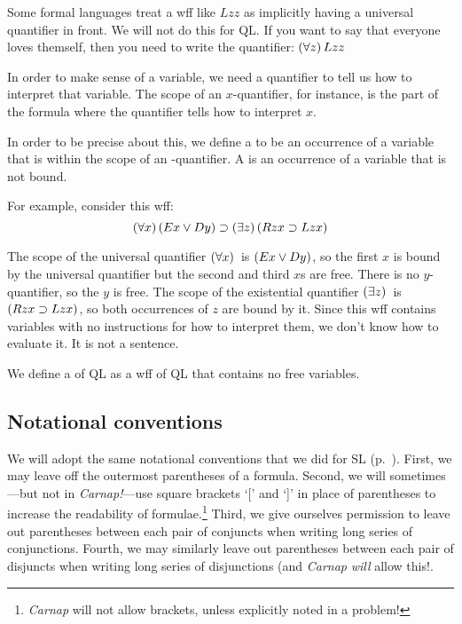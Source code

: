 Some formal languages treat a wff like $Lzz$ as implicitly having a universal quantifier in front. We will not do this for QL. If you want to say that everyone loves themself, then you need to write the quantifier: $(\forall z) \,Lzz$

In order to make sense of a variable, we need a quantifier to tell us how to interpret that variable. The scope of an $x$-quantifier, for instance, is the part of the formula where the quantifier tells how to interpret $x$.

In order to be precise about this, we define a  to be an occurrence of a variable  that is within the scope of an -quantifier. A  is an occurrence of a variable that is not bound.

For example, consider this wff: $$(\forall x) \,(Ex \vee Dy) \supset (\exists z) \,(Rzx \supset Lzx)$$ 

The scope of the universal quantifier $(\forall x) \,$ is $(Ex \vee Dy)$, so the first $x$ is bound by the universal quantifier but the second and third $x$s are free. There is no $y$-quantifier, so the $y$ is free. The scope of the existential quantifier $(\exists z) \,$ is $(Rzx \supset Lzx)$, so both occurrences of $z$ are bound by it. Since this wff contains variables with no instructions for how to interpret them, we don't know how to evaluate it. It is not a sentence.

We define a  of QL as a wff of QL that contains no free variables.

\subsection{Notational conventions}

We will adopt the same notational conventions that we did for SL (p.~\pageref{SLconventions}). First, we may leave off the outermost parentheses of a formula. Second, we will sometimes---but not in \textit{Carnap!}---use square brackets `[' and `]' in place of parentheses to increase the readability of formulae.\footnote{{\color{black} \textit{Carnap} will not allow brackets, unless explicitly noted in a problem!}} Third, we give ourselves permission to leave out parentheses between each pair of conjuncts when writing long series of conjunctions. Fourth, we may similarly leave out parentheses between each pair of disjuncts when writing long series of disjunctions {\color{black}(and \textit{Carnap} \textit{will} allow this!}.

